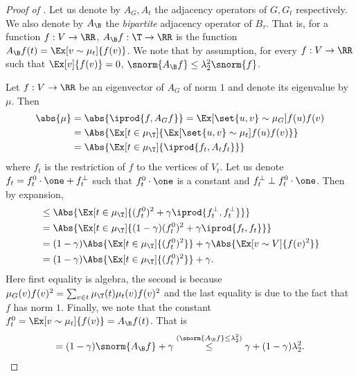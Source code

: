 \begin{proof}[Proof of ]
    Let us denote by \(A_G,A_t\) the adjacency operators of \(G,G_t\) respectively. We also denote by \(A_\B\) the \emph{bipartite} adjacency operator of \(B_\tau\). That is, for a function \(f:V \to \RR\), \(A_\B f:\T \to \RR\) is the function \(A_\B f(t) = \Ex[v \sim \mu_t]{f(v)}\). We note that by assumption, for every \(f:V \to \RR\) such that \(\Ex[v]{f(v)} = 0\), \(\snorm{A_\B f} \leq \lambda_2^2 \snorm{f}\).
    
    Let \(f:V \to \RR\) be an eigenvector of \(A_G\) of norm \(1\) and denote its eigenvalue by \(\mu\). %
    Then
    \begin{align*}
      \abs{\mu} &= \abs{\iprod{f,A_G f}} = \Ex[\set{u,v} \sim \mu_G]{f(u)f(v)} \\
      &= \Abs{\Ex[t \in \mu_\T]{\Ex[\set{u,v} \sim \mu_t]{f(u)f(v)}}} \\
      &= \Abs{\Ex[t \in \mu_\T]{\iprod{f_t,A_t f_t}}}
    \end{align*}
    where \(f_t\) is the restriction of \(f\) to the vertices of \(V_t\). Let us denote \(f_t = f_t^0\cdot \one + f_t^\perp\) such that \(f_t^0\cdot \one\) is a constant and \(f_t^\perp \perp f_t^0 \cdot \one\). Then by expansion,
      \begin{align*}
      &\leq \Abs{\Ex[t \in \mu_\T]{(f_t^0)^2 + \gamma \iprod{f_t^\perp,f_t^\perp}}} \\
      &= \Abs{\Ex[t \in \mu_\T]{(1-\gamma)(f_t^0)^2 + \gamma \iprod{f_t,f_t}}} \\
      & = (1-\gamma)\Abs{\Ex[t \in \mu_\T]{(f_t^0)^2}} + \gamma \Abs{\Ex[v \sim V]{f(v)^2}} \\
      &= (1-\gamma)\Abs{\Ex[t \in \mu_\T]{(f_t^0)^2}} + \gamma.
    \end{align*}
    Here first equality is algebra, the second is because \(\mu_G(v)f(v)^2 = \sum_{v \in t}\mu_\T(t) \mu_t(v)f(v)^2\) and the last equality is due to the fact that \(f\) has norm \(1\). Finally, we note that the constant \(f_t^0 = \Ex[v \sim \mu_t]{f(v)} = A_\B f(t)\). That is
    \[
         = (1-\gamma)\snorm{A_\B f} + \gamma \overset{(\snorm{A_\B f} \leq \lambda_2^2)}{\leq} \gamma + (1-\gamma)\lambda_2^2.
    \]
\end{proof}

